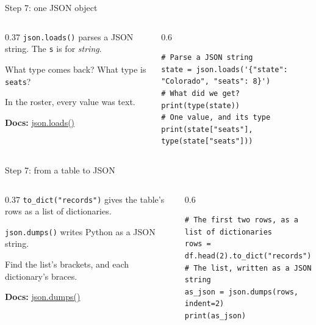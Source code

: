 \documentclass[9pt,aspectratio=169]{beamer}
\begin{document}
\begin{frame}[fragile]{Step 7: one JSON object}
    \begin{columns}[T]
        \begin{column}{0.37\textwidth}
            \texttt{json.loads()} parses a JSON string. The \texttt{s} is for \textit{string}.

            \medskip
            What type comes back? What type is \texttt{seats}?

            \medskip
            In the roster, every value was text.

            \medskip
            {\scriptsize\textbf{Docs:} \href{https://docs.python.org/3/library/json.html\#json.loads}{json.loads()}\par}
        \end{column}
        \begin{column}{0.6\textwidth}
\begin{lstlisting}
# Parse a JSON string
state = json.loads('{"state": "Colorado", "seats": 8}')
# What did we get?
print(type(state))
# One value, and its type
print(state["seats"], type(state["seats"]))
\end{lstlisting}
        \end{column}
    \end{columns}
\end{frame}

\begin{frame}[fragile]{Step 7: from a table to JSON}
    \begin{columns}[T]
        \begin{column}{0.37\textwidth}
            \texttt{to\_dict("records")} gives the table's rows as a list of dictionaries.

            \medskip
            \texttt{json.dumps()} writes Python as a JSON string.

            \medskip
            Find the list's brackets, and each dictionary's braces.

            \medskip
            {\scriptsize\textbf{Docs:} \href{https://docs.python.org/3/library/json.html\#json.dumps}{json.dumps()}\par}
        \end{column}
        \begin{column}{0.6\textwidth}
\begin{lstlisting}
# The first two rows, as a list of dictionaries
rows = df.head(2).to_dict("records")
# The list, written as a JSON string
as_json = json.dumps(rows, indent=2)
print(as_json)
\end{lstlisting}
        \end{column}
    \end{columns}
\end{frame}
\end{document}
